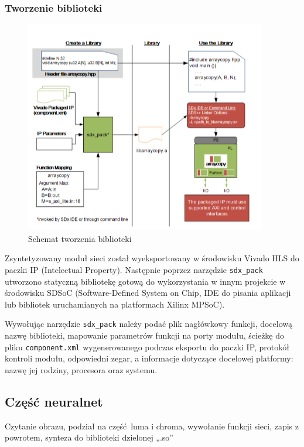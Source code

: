 \documentclass[12pt, oneside, a4paper]{article}
\begin{document}
\subsubsection{Tworzenie biblioteki}
\begin{figure}[h]
  \centering
  \includegraphics[scale=0.7]{figures/c-call.png}
  \caption{Schemat tworzenia biblioteki}\label{fig:ccall}
\end{figure}
Zsyntetyzowany moduł sieci został wyeksportowany w środowisku Vivado HLS
do paczki IP (Intelectual Property). Następnie poprzez narzędzie
\lstinline{sdx_pack} utworzono statyczną bibliotekę gotową do wykorzystania
w innym projekcie w środowisku SDSoC (Software-Defined System on Chip,
IDE do pisania aplikacji lub bibliotek uruchamianych na platformach
Xilinx MPSoC).

\begin{minipage}{\linewidth}

\end{minipage}

Wywołując narzędzie \lstinline{sdx_pack} należy podać plik nagłówkowy funkcji,
docelową nazwę biblioteki, mapowanie parametrów funkcji na porty modułu,
ścieżkę do pliku \lstinline{component.xml} wygenerowanego podczas eksportu
do paczki IP, protokół kontroli modułu, odpowiedni zegar, a informacje
dotyczące docelowej platformy: nazwę jej rodziny, procesora oraz systemu.

\subsection{Część neuralnet}
Czytanie obrazu, podział na część luma i chroma, wywołanie funkcji sieci,
zapis z powrotem, synteza do biblioteki dzielonej „.so”
\end{document}
